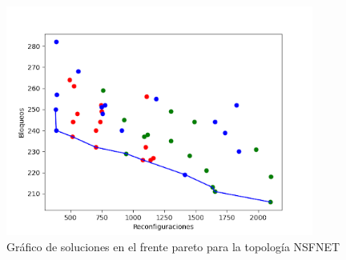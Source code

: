 \begin{itemize}
 \begin{figure}[H]\ContinuedFloat
    \centering
    \includegraphics[width=0.9\textwidth]{capitulos/img/nsfnet_pareto_3.png}
    \caption{Gráfico de soluciones en el frente pareto para la topología NSFNET}
    \label{fig:paretoNSFNET}
 \end{figure}


\end{itemize}
